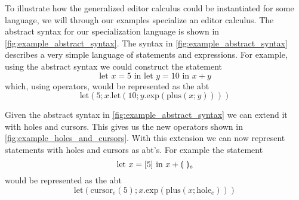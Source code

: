 \documentclass[sigplan,screen]{acmart}
\begin{document}
\begin{example}\label{ex:abstract_syntax}
    To illustrate how the generalized editor calculus could be instantiated for some language, we will through our examples specialize an editor calculus. The abstract syntax for our specialization language is shown in \cref{fig:example_abstract_syntax}.
    The syntax in \cref{fig:example_abstract_syntax} describes a very simple language of statements and expressions. For example, using the abstract syntax we could construct the statement
    \begin{equation*}
        \text{let $x=5$ in let $y=10$ in $x+y$}
    \end{equation*}
    which, using operators, would be represented as the abt
    \begin{equation*}
        \text{let}(5;x.\text{let}(10;y.\text{exp}(\text{plus}(x;y))))
    \end{equation*} 
    
    Given the abstract syntax in \cref{fig:example_abstract_syntax} we can extend it with holes and cursors. This gives us the new operators shown in \cref{fig:example_holes_and_cursors}.
    With this extension we can now represent statements with holes and cursors as abt's. For example the statement
    \begin{equation*}
        \text{let $x=[5]$ in $x+\llparenthesis \ \rrparenthesis_e$}
    \end{equation*}
    would be represented as the abt
    \begin{equation*}
        \text{let}(\text{cursor}_e(5); x.\text{exp}(\text{plus}(x;\text{hole}_e)))    
    \end{equation*}
\end{example}
\end{document}
